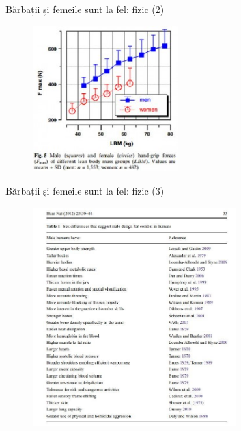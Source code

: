 \documentclass{simple}
\begin{document}
\begin{frame}{Bărbații și femeile sunt la fel: fizic (2)}
  \centering
  \begin{figure}
    \includegraphics[width=0.5\textwidth]{img/male-female-grip}
  \end{figure}
\end{frame}

\begin{frame}{Bărbații și femeile sunt la fel: fizic (3)}
  \centering
  \begin{figure}
    \includegraphics[width=0.7\textwidth]{img/male-combat}
  \end{figure}
\end{frame}
\end{document}
